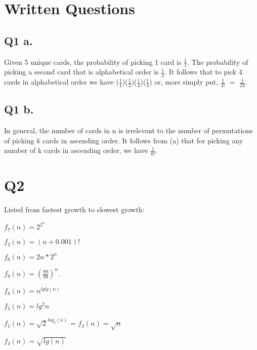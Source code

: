 \documentclass[12pt]{article}
\begin{document}

\pagestyle{fancy}

\vspace{5mm} %

\section{Written Questions}

\subsection{Q1 a.}
Given 5 unique cards, the probability of picking 1 card is $\frac{1}{1}$. The probability of picking a second card that is alphabetical order is $\frac{1}{2}$.  It follows that to pick 4 cards in alphabetical order we have ($\frac{1}{1}$)($\frac{1}{2}$)($\frac{1}{3}$)($\frac{1}{4}$) or, more simply put, $\frac{1}{4!}$ $=$ $\frac{1}{24}$.


\subsection{Q1 b.}
In general, the number of cards in n is irrelevant to the number of permutations of picking $k$ cards in ascending order. It follows from (a) that for picking any number of k cards in ascending order, we have $\frac{1}{k!}$.

\section{Q2}
Listed from fastest growth to slowest growth: 

$f_7(n) = 2^{2^n}$ \par
$f_2(n) = (n + 0.001)!$ \par
$f_6(n) = 2n*2^n$ \par
$f_9(n) = (\frac{99}{98})^n$. \par
$f_8(n) = n^{lg lg (n)}$ \par
$f_5(n) = lg^2n$ \par
$f_1(n) = \sqrt{2}^{log_2(n)}$ = $f_3(n) = \sqrt{n}$\par
\par
$f_4(n) = \sqrt{lg(n)}$   
\end{document}
